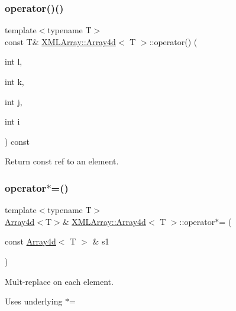 \subsubsection{\texorpdfstring{operator()()}{operator()()}\hspace{0.1cm}{\footnotesize\ttfamily [4/4]}}
{\footnotesize\ttfamily template$<$typename T$>$ \\
const T\& \mbox{\hyperlink{classXMLArray_1_1Array4d}{X\+M\+L\+Array\+::\+Array4d}}$<$ T $>$\+::operator() (\begin{DoxyParamCaption}\item[{int}]{l,  }\item[{int}]{k,  }\item[{int}]{j,  }\item[{int}]{i }\end{DoxyParamCaption}) const\hspace{0.3cm}{\ttfamily [inline]}}



Return const ref to an element. 

\mbox{\label{classXMLArray_1_1Array4d_accb002ecd8742a2aba3e4acaf92963c6}} 
\subsubsection{\texorpdfstring{operator$\ast$=()}{operator*=()}\hspace{0.1cm}{\footnotesize\ttfamily [1/4]}}
{\footnotesize\ttfamily template$<$typename T$>$ \\
\mbox{\hyperlink{classXMLArray_1_1Array4d}{Array4d}}$<$T$>$\& \mbox{\hyperlink{classXMLArray_1_1Array4d}{X\+M\+L\+Array\+::\+Array4d}}$<$ T $>$\+::operator$\ast$= (\begin{DoxyParamCaption}\item[{const \mbox{\hyperlink{classXMLArray_1_1Array4d}{Array4d}}$<$ T $>$ \&}]{s1 }\end{DoxyParamCaption})\hspace{0.3cm}{\ttfamily [inline]}}



Mult-\/replace on each element. 

Uses underlying $\ast$= \mbox{\label{classXMLArray_1_1Array4d_accb002ecd8742a2aba3e4acaf92963c6}} 
